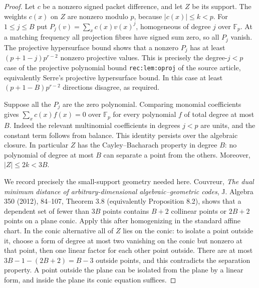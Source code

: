 \documentclass[11pt]{article}
\begin{document}
\begin{proof}
Let $c$ be a nonzero signed packet difference, and let $Z$ be its support. The weights $c(x)$ on $Z$ are nonzero modulo $p$, because $|c(x)|\le k<p$. For $1\le j\le B$ put $P_j(v)=\sum_x c(x)v(x)^j$, homogeneous of degree $j$ over $\mathbb F_p$. At a matching frequency all projection fibres have signed sum zero, so all $P_j$ vanish. The projective hypersurface bound shows that a nonzero $P_j$ has at least $(p+1-j)p^{r-2}$ nonzero projective values. This is precisely the degree-$j<p$ case of the projective polynomial bound \texttt{rec:lem:oproj} of the source article, equivalently Serre's projective hypersurface bound. In this case at least $(p+1-B)p^{r-2}$ directions disagree, as required.

Suppose all the $P_j$ are the zero polynomial. Comparing monomial coefficients gives $\sum_x c(x)f(x)=0$ over $\mathbb F_p$ for every polynomial $f$ of total degree at most $B$. Indeed the relevant multinomial coefficients in degrees $j<p$ are units, and the constant term follows from balance. This identity persists over the algebraic closure. In particular $Z$ has the Cayley--Bacharach property in degree $B$: no polynomial of degree at most $B$ can separate a point from the others. Moreover, $|Z|\le2k<3B$.

We record precisely the small-support geometry needed here. Couvreur, \emph{The dual minimum distance of arbitrary-dimensional algebraic--geometric codes}, J. Algebra 350 (2012), 84--107, Theorem 3.8 (equivalently Proposition 8.2), shows that a dependent set of fewer than $3B$ points contains $B+2$ collinear points or $2B+2$ points on a plane conic. Apply this after homogenizing in the standard affine chart. In the conic alternative all of $Z$ lies on the conic: to isolate a point outside it, choose a form of degree at most two vanishing on the conic but nonzero at that point, then one linear factor for each other point outside. There are at most $3B-1-(2B+2)=B-3$ outside points, and this contradicts the separation property. A point outside the plane can be isolated from the plane by a linear form, and inside the plane its conic equation suffices.


\end{proof}
\end{document}
